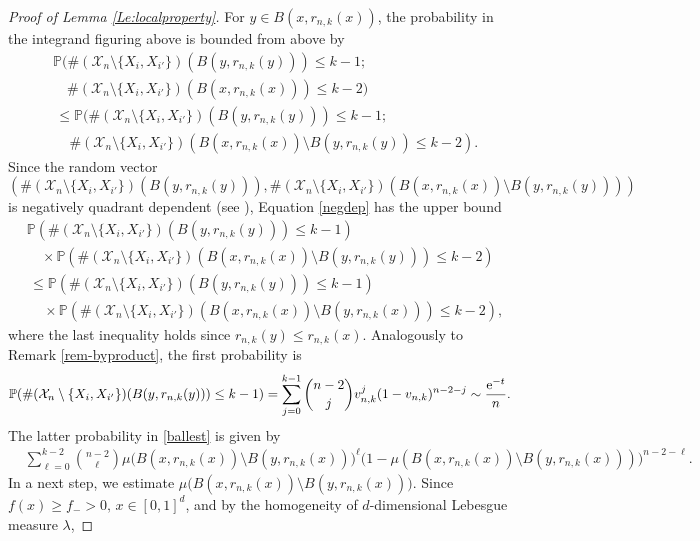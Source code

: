 \documentclass{article}
\theoremstyle{thm}
\theoremstyle{definition}
\theoremstyle{definition}
\theoremstyle{def}
\newcommand{\PP}{\mathbb{P}} %
\begin{document}
\begin{proof}[Proof of Lemma \ref{Le:localproperty}]
	For $y \in B(x,r_{n,k}(x))$, the probability in the integrand figuring above is bounded from above by
	\begin{align}
		&\PP(\#(\mathcal{X}_n \setminus \{X_i,X_{i'}\})(B(y,r_{n,k}(y)))\le k-1;\nonumber\\
		&\quad  \#(\mathcal{X}_n \setminus \{X_i,X_{i'}\})(B(x,r_{n,k}(x)))\le k-2)\nonumber\\
		&\, \le \PP(\#(\mathcal{X}_n \setminus \{X_i,X_{i'}\})(B(y,r_{n,k}(y)))\le k-1;\nonumber\\
		&\, \quad  \#(\mathcal{X}_n \setminus \{X_i,X_{i'}\})(B(x,r_{n,k}(x))\setminus B(y,r_{n,k}(y))\le k-2).\label{negdep}
	\end{align}
	Since the random vector
	\[
	\left(\#(\mathcal{X}_n \setminus \{X_i,X_{i'}\})(B(y,r_{n,k}(y))),\#(\mathcal{X}_n \setminus \{X_i,X_{i'}\})(B(x,r_{n,k}(x))\setminus B(y,r_{n,k}(y)))\right)
	\]
	is negatively quadrant dependent (see \cite[Section 3.1]{JP83}), Equation \eqref{negdep} has the upper bound
	\begin{align}
		& \PP(\#(\mathcal{X}_n \setminus \{X_i,X_{i'}\})(B(y,r_{n,k}(y)))\le k-1)\nonumber\\
		&\quad \times \PP( \#(\mathcal{X}_n \setminus \{X_i,X_{i'}\})(B(x,r_{n,k}(x))\setminus B(y,r_{n,k}(y)))\le k-2)\nonumber\\
		&\, \le \PP(\#(\mathcal{X}_n \setminus \{X_i,X_{i'}\})(B(y,r_{n,k}(y)))\le k-1)\nonumber\\
		&\, \quad \times  \PP( \#(\mathcal{X}_n \setminus \{X_i,X_{i'}\})(B(x,r_{n,k}(x))\setminus B(y,r_{n,k}(x)))\le k-2),\label{ballest}
	\end{align}
	where the last inequality holds since $r_{n,k}(y) \le r_{n,k}(x)$. Analogously to Remark \ref{rem-byproduct},  the first probability {is}
	\begin{align*}
		\PP(\#(\mathcal{X}_n \setminus \{X_i,X_{i'}\})(B(y,r_{n,k}(y)))\le k-1)= \sum_{j=0}^{k-1} {n-2 \choose j} v_{n,k}^j (1-v_{n,k})^{n-2-j} \sim \frac{{\rm e}^{-t}}{n}.
	\end{align*}
	The latter probability in \eqref{ballest} is given by
	\begin{align}
		&\sum_{\ell=0}^{k-2} \binom{n-2}{\ell} \mu \big(B(x,r_{n,k}(x))\setminus B(y,r_{n,k}(x))\big)^\ell \big(1-\mu(B(x,r_{n,k}(x))\setminus B(y,r_{n,k}(x)))\big)^{n-2-\ell}. \label{bindist}
	\end{align}
	In a next step, we estimate $\mu \big(B(x,r_{n,k}(x))\setminus B(y,r_{n,k}(x))\big)$. Since $f(x) \ge f_- >0,\,x \in {[0,1]^d}$, and by the homogeneity of $d$-dimensional Lebesgue measure $\lambda$,

\end{proof}
\end{document}
